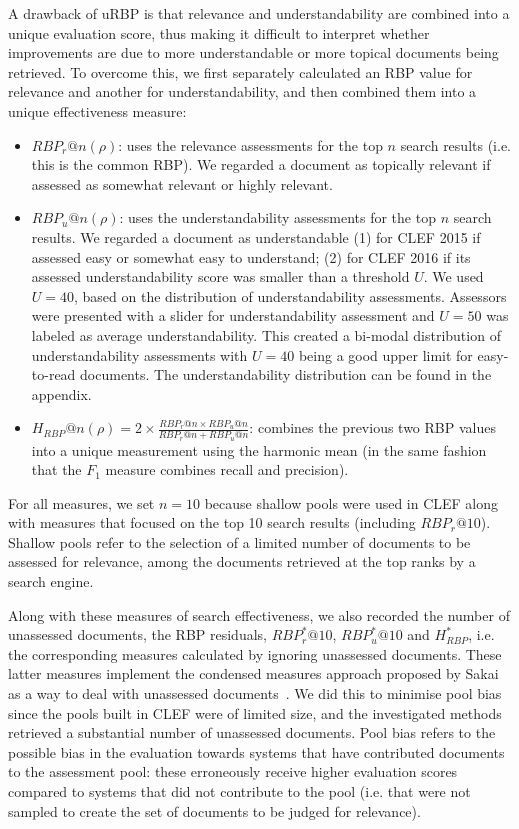 \documentclass[10pt,a4paper]{article}
\begin{document}
A drawback of uRBP is that relevance and understandability are combined into a unique evaluation score, thus making it difficult to interpret whether improvements are due to more understandable or more topical documents being retrieved. To overcome this, we first separately calculated an RBP value for relevance and another for understandability, and then combined them into a unique effectiveness measure:

\begin{itemize}[leftmargin=*]
	\item $RBP_r@n(\rho)$: uses the relevance assessments for the top $n$ search results (i.e. this is the common RBP). We regarded a document as topically relevant if assessed as somewhat relevant or highly relevant.
	
    \item $RBP_u@n(\rho)$: uses the understandability assessments for the top $n$ search results. We regarded a document as understandable (1) for CLEF 2015 if assessed easy or somewhat easy to understand; (2) for CLEF 2016 if its assessed understandability score was smaller than a threshold $U$. We used $U=40$, based on the distribution of understandability assessments. Assessors were presented with a slider for understandability assessment and $U=50$ was labeled as average understandability. This created a bi-modal distribution of understandability assessments with $U=40$ being a good upper limit for easy-to-read documents. The understandability distribution can be found in the appendix.
	
	\item $H_{RBP}@n(\rho) = 2 \times \frac{RBP_r@n \times RBP_u@n}{RBP_r@n + RBP_u@n}$: combines the previous two RBP values into a unique measurement using the harmonic mean (in the same fashion that the $F_1$ measure combines recall and precision).
\end{itemize}

\noindent For all measures, we set $n=10$ because shallow pools were used in CLEF along with measures that focused on the top 10 search results (including $RBP_r@10$). Shallow pools refer to the selection of a limited number of documents to be assessed for relevance, among the documents retrieved at the top ranks by a search engine.

Along with these measures of search effectiveness, we also recorded the number of unassessed documents, the RBP residuals,  $RBP^*_r@10$, $RBP^*_u@10$ and $H_{RBP}^*$, i.e. the corresponding measures calculated by ignoring unassessed documents. These latter measures implement the condensed measures approach proposed by Sakai as a way to deal with unassessed documents~\cite{sakai2007alternatives}. We did this to minimise pool bias since the pools built in CLEF were of limited size, and the investigated methods retrieved a substantial number of unassessed documents. Pool bias refers to the possible bias in the evaluation towards systems that have contributed documents to the assessment pool: these erroneously receive higher evaluation scores compared to systems that did not contribute to the pool (i.e. that were not sampled to create the set of documents to be judged for relevance). 
\end{document}
